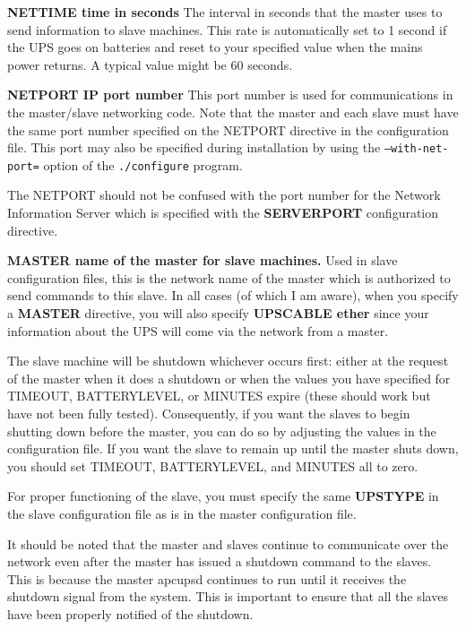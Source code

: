\begin{description}
\item {\bf NETTIME \lt{}time in seconds\gt{}}
The interval in seconds that the master uses to send information to slave
machines. This rate is automatically set to 1 second if the UPS goes on
batteries and reset to your specified value when the mains power returns. A
typical value might be 60 seconds.  

\item {\bf NETPORT \lt{}IP port number\gt{}}
This port number is used for communications in the master/slave networking
code. Note that the master and each slave must have the same port number
specified on the NETPORT directive in the configuration file. This port may
also be specified during installation by using the {\tt --with-net-port=}
option of the {\tt ./configure} program.  

The NETPORT should not be confused with the port number for the Network
Information Server which is specified with the {\bf SERVERPORT} configuration
directive.  

\item {\bf MASTER \lt{}name of the master\gt{} for slave machines.}
Used in slave configuration files, this is the network name of the master
which is authorized to send commands to this slave. In all cases (of which I
am aware), when you specify a {\bf MASTER} directive, you will also specify
{\bf UPSCABLE ether} since your information about the UPS will come via the
network from a master.  

The slave machine will be shutdown whichever occurs first: either at the
request of the master when it does a shutdown or when the values you have
specified for TIMEOUT, BATTERYLEVEL, or MINUTES expire (these should work but
have not been fully tested). Consequently, if you want the slaves to begin
shutting down before the master, you can do so by adjusting the values in the
configuration file. If you want the slave to remain up until the master shuts
down, you should set TIMEOUT, BATTERYLEVEL, and MINUTES all to zero.  

For proper functioning of the slave, you must specify the same {\bf UPSTYPE}
in the slave configuration file as is in the master configuration file.  

It should be noted that the master and slaves continue to communicate over the
network even after the master has issued a shutdown command to the slaves.
This is because the master apcupsd continues to run until it receives the
shutdown signal from the system. This is important to ensure that all the
slaves have been properly notified of the shutdown.  


\end{description}
